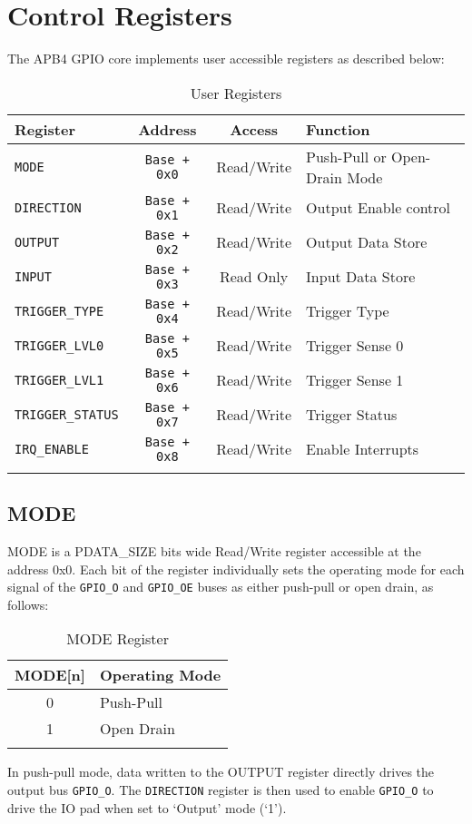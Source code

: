 \section{Control Registers}\label{registers}

The APB4 GPIO core implements user accessible registers as described below:

\begin{longtable}[]{@{}lccl@{}}
\toprule
\textbf{Register} & \textbf{Address} & \textbf{Access} & \textbf{Function}\tabularnewline
\midrule
\endhead
\texttt{MODE} & \texttt{Base + 0x0} & Read/Write & Push-Pull or Open-Drain Mode\tabularnewline
\texttt{DIRECTION} & \texttt{Base + 0x1} & Read/Write & Output Enable control\tabularnewline
\texttt{OUTPUT} & \texttt{Base + 0x2} & Read/Write & Output Data Store\tabularnewline
\texttt{INPUT} & \texttt{Base + 0x3} & Read Only & Input Data Store\tabularnewline
\texttt{TRIGGER\_TYPE} & \texttt{Base + 0x4} & Read/Write & Trigger Type\tabularnewline
\texttt{TRIGGER\_LVL0} & \texttt{Base + 0x5} & Read/Write & Trigger Sense 0\tabularnewline
\texttt{TRIGGER\_LVL1} & \texttt{Base + 0x6} & Read/Write & Trigger Sense 1\tabularnewline
\texttt{TRIGGER\_STATUS} & \texttt{Base + 0x7} & Read/Write & Trigger Status\tabularnewline
\texttt{IRQ\_ENABLE} & \texttt{Base + 0x8} & Read/Write & Enable Interrupts\tabularnewline
\bottomrule
\caption{User Registers}
\end{longtable}

\subsection{MODE}\label{mode}

MODE is a PDATA\_SIZE bits wide Read/Write register accessible at the address 0x0. Each bit of the register individually sets the operating mode for each signal of the \texttt{GPIO\_O} and \texttt{GPIO\_OE} buses as either push-pull or open drain, as follows:

\begin{longtable}[]{@{}cl@{}}
\toprule
\textbf{MODE[n]} & \textbf{Operating Mode}\tabularnewline
\midrule
\endhead
0 & Push-Pull\tabularnewline
1 & Open Drain\tabularnewline
\bottomrule
\caption{MODE Register}
\end{longtable}

In push-pull mode, data written to the OUTPUT register directly drives
the output bus \texttt{GPIO\_O}. The \texttt{DIRECTION} register is then used to enable
\texttt{GPIO\_O} to drive the IO pad when set to `Output' mode (`1').

